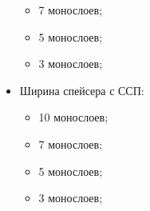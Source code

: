 \documentclass[10pt,pdf,hyperref={unicode},aspectratio={169}]{beamer}
\begin{document}
\begin{frame}
\begin{columns}
\begin{itemize}
\begin{itemize}
			\item 7 монослоев;
			\item 5 монослоев;
			\item 3 монослоев;
		\end{itemize}
		\item Ширина спейсера с ССП: \begin{itemize}
			\footnotesize
			\item 10 монослоев;
			\item 7 монослоев;
			\item 5 монослоев;
			\item 3 монослоев;
		\end{itemize} 
	\end{itemize}
\end{columns}
\end{frame}
\end{document}
